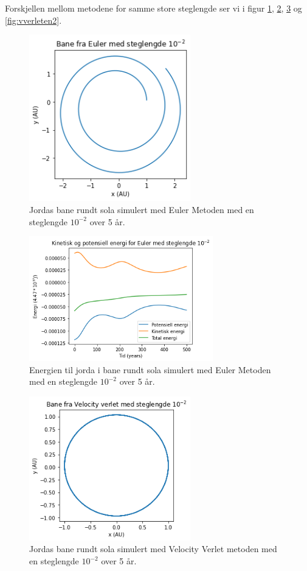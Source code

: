 \documentclass[reprint,english,notitlepage]{revtex4-1}
\begin{document}
	Forskjellen mellom metodene for samme store steglengde ser vi i figur \ref{fig:euler2}, \ref{fig:euleren2}, \ref{fig:vverlet2} og \ref{fig:vverleten2}.
	\begin{figure}[H]
		\includegraphics[width=70mm]{../Code/Figures/euler2.png}
		\caption{Jordas bane rundt sola simulert med Euler Metoden med en steglengde $10^{-2}$ over 5 år.}
		\label{fig:euler2}
	\end{figure}

	\begin{figure}[H]
		\includegraphics[width=80mm]{../Code/Figures/euleren2.png}
		\caption{Energien til jorda i bane rundt sola simulert med Euler Metoden med en steglengde $10^{-2}$ over 5 år.}
		\label{fig:euleren2}
	\end{figure}

	\begin{figure}[H]
		\includegraphics[width=70mm]{../Code/Figures/vverlet2.png}
		\caption{Jordas bane rundt sola simulert med Velocity Verlet metoden med en steglengde $10^{-2}$ over 5 år.}
		\label{fig:vverlet2}
	\end{figure}
	
\end{document}
